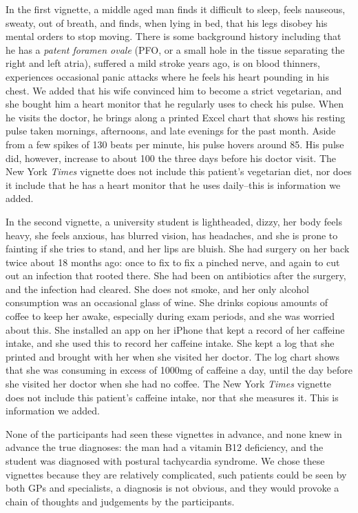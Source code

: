\documentclass{sigchi}
\begin{document}
In the first vignette, a middle aged man finds it difficult to sleep, feels nauseous, sweaty, out of breath, and finds, when lying in bed, that his legs disobey his mental orders to stop moving.   There is some background history including that he has a \emph{patent foramen ovale} (PFO, or a small hole in the tissue separating the right and left atria), suffered a mild stroke years ago, is on blood thinners, experiences occasional panic attacks where he feels his heart pounding in his chest.  We added that his wife convinced him to become a strict vegetarian, and she bought him a heart monitor that he regularly uses to check his pulse. When he visits the doctor, he brings along a printed Excel chart that shows his resting pulse taken mornings, afternoons, and late evenings for the past month. Aside from a few spikes of 130 beats per minute, his pulse hovers around 85.  His pulse did, however, increase to about 100 the three days before his doctor visit.  The New York \emph{Times} vignette does not include this patient's vegetarian diet, nor does it include that he has a heart monitor that he uses daily--this is information we added.

In the second vignette, a university student is lightheaded, dizzy, her body feels heavy, she feels anxious, has blurred vision, has headaches, and she is prone to fainting if she tries to stand, and her lips are bluish. She had surgery on her back twice about 18 months ago: once to fix to fix a pinched nerve, and again to cut out an infection that rooted there.  She had been on antibiotics after the surgery, and the infection had cleared.  She does not smoke, and her only alcohol consumption was an occasional glass of wine.  She drinks copious amounts of coffee to keep her awake, especially during exam periods, and she was worried about this.  She installed an app on her iPhone that kept a record of her caffeine intake, and she used this to record her caffeine intake. She kept a log that she printed and brought with her when she visited her doctor. The log chart shows that she was consuming in excess of 1000mg of caffeine a day, until the day before she visited her doctor when she had no coffee.  The New York \emph{Times} vignette does not include this patient's caffeine intake, nor that she measures it.  This is information we added.

None of the participants had seen these vignettes in advance, and none knew in advance the true diagnoses: the man had a vitamin B12 deficiency, and the student was diagnosed with postural tachycardia syndrome.  We chose these vignettes because they are relatively complicated, such patients could be seen by both GPs and specialists, a diagnosis is not obvious, and they would provoke a chain of thoughts and judgements by the participants.
\end{document}
